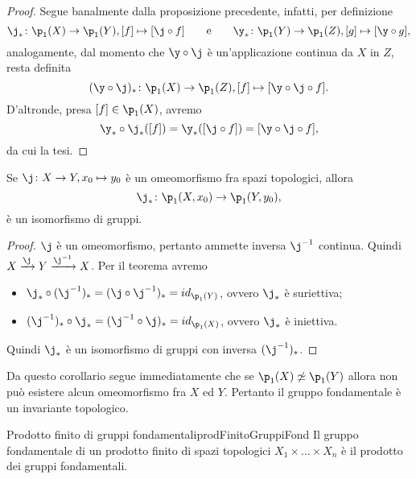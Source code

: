 \begin{proof}
	Segue banalmente dalla proposizione precedente, infatti, per definizione
	\[
		\j_* \colon \p_1(X) \to \p_1(Y), [f]\mapsto [\j\circ f] \qquad\text{e}\qquad \y_* \colon \p_1(Y) \to \p_1(Z), [g]\mapsto [\y\circ g],
	\]
	analogamente, dal momento che \(\y\circ \j\) è un'applicazione continua da \(X\) in \(Z\), resta definita
	\[
		(\y\circ \j)_* \colon \p_1(X) \to \p_1(Z), [f] \mapsto [\y\circ \j\circ f].
	\]
	D'altronde, presa \([f]\in \p_1(X)\), avremo
	\[
		\y_* \circ \j_* ([f]) = \y_*([\j\circ f]) = [\y\circ \j\circ f],
	\]
	da cui la tesi.
\end{proof}

\begin{cor}
	Se \(\j\colon X \to Y,x_0 \mapsto y_0\) è un omeomorfismo fra spazi topologici, allora
	\[
		\j_*\colon \p_1(X,x_0) \to \p_1(Y,y_0),
	\]
	è un isomorfismo di gruppi.
\end{cor}

\begin{proof}
	\(\j\) è un omeomorfismo, pertanto ammette inversa \(\j^{-1}\) continua.
	Quindi \(X \xrightarrow{\j} Y \xrightarrow{\j^{-1}} X\).
	Per il teorema avremo
	\begin{itemize}
		\item \(\j_* \circ (\j^{-1})_* = (\j\circ \j^{-1})_* = id_{\p_1(Y)}\), ovvero \(\j_*\) è suriettiva;
		\item \((\j^{-1})_* \circ \j_* = (\j^{-1}\circ \j)_* = id_{\p_1(X)}\), ovvero \(\j_*\) è iniettiva.
	\end{itemize}
	Quindi \(\j_*\) è un isomorfismo di gruppi con inversa \((\j^{-1})_*\).
\end{proof}

\begin{oss}
	Da questo corollario segue immediatamente che se \(\p_1(X) \not\simeq \p_1(Y)\) allora non può esistere alcun omeomorfismo fra \(X\) ed \(Y\).
	Pertanto il gruppo fondamentale è un invariante topologico.
\end{oss}

\begin{prop}{Prodotto finito di gruppi fondamentali}{prodFinitoGruppiFond}
	Il gruppo fondamentale di un prodotto finito di spazi topologici \(X_1 \times \ldots  \times X_n\) è il prodotto dei gruppi fondamentali.
\end{prop}

